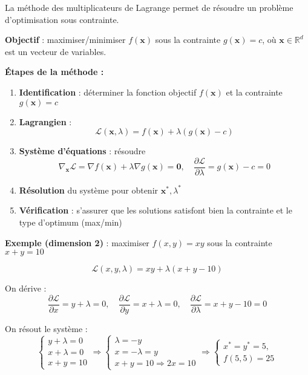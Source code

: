 \begin{f}
	
	La méthode des multiplicateurs de Lagrange permet de résoudre un problème d'optimisation sous contrainte.
	
	\textbf{Objectif} : maximiser/minimiser \(f(\boldsymbol{x})\) sous la contrainte \(g(\boldsymbol{x}) = c\), où \(\boldsymbol{x} \in \mathbb{R}^d\) est un vecteur de variables.
	
	\textbf{Étapes de la méthode :}
	\begin{enumerate}
		\item \textbf{Identification} : déterminer la fonction objectif \(f(\boldsymbol{x})\) et la contrainte \(g(\boldsymbol{x}) = c\)
		\item \textbf{Lagrangien} :
		\[
		\mathcal{L}(\boldsymbol{x}, \lambda) = f(\boldsymbol{x}) + \lambda (g(\boldsymbol{x}) - c)
		\]
		\item \textbf{Système d'équations} : résoudre
		\[
		\nabla_{\boldsymbol{x}} \mathcal{L} = \nabla f(\boldsymbol{x}) + \lambda \nabla g(\boldsymbol{x}) = \boldsymbol{0}, \quad
		\frac{\partial \mathcal{L}}{\partial \lambda} = g(\boldsymbol{x}) - c = 0
		\]
		\item \textbf{Résolution} du système pour obtenir \(\boldsymbol{x}^*, \lambda^*\)
		\item \textbf{Vérification} : s'assurer que les solutions satisfont bien la contrainte et le type d'optimum (max/min)
	\end{enumerate}
	
	\textbf{Exemple (dimension 2)} : maximiser \(f(x, y) = xy\) sous la contrainte \(x + y = 10\)
	
	\[
	\mathcal{L}(x, y, \lambda) = xy + \lambda (x + y - 10)
	\]
	
	On dérive :
	\[
	\frac{\partial \mathcal{L}}{\partial x} = y + \lambda = 0, \quad
	\frac{\partial \mathcal{L}}{\partial y} = x + \lambda = 0, \quad
	\frac{\partial \mathcal{L}}{\partial \lambda} = x + y - 10 = 0
	\]
	
	On résout le système :
\[
\begin{cases}
	y + \lambda = 0 \\
	x + \lambda = 0 \\
	x + y = 10
\end{cases}
\Rightarrow 
\begin{cases}
	\lambda = -y \\
	x = -\lambda = y \\
	x + y = 10 \Rightarrow 2x = 10 
\end{cases}
\Rightarrow 
	\begin{cases} 
		x^* =  y^*= 5,\\
		f(5,5) = 25
	\end{cases}
\]


\end{f}
